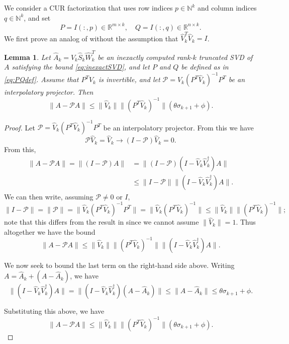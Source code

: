 \documentclass[10pt,a4paper]{amsart}
\newcommand{\What}{\widehat{W}}
\newcommand{\Shat}{\widehat{S}}
\newcommand{\Vhat}{\widehat{V}}
\newcommand{\E}{\theta}
\newcommand{\F}{\phi}
\def\norm#1{\|#1\|}
\newtheorem{lemma}[theorem]{Lemma}
\begin{document}
 We consider a CUR factorization that uses row indices $p\in\mathbb{N}^k$ and column indices $q\in\mathbb{N}^k$, and set
\begin{equation}
P=I(:,p)\in\mathbb{R}^{m\times k}, \quad Q=I(:,q)\in\mathbb{R}^{n\times k}.
\label{eq:PQdef}
\end{equation}
We first prove an analog of \cite[Lemma 4.1]{sorensen2016deim} without the assumption that $\Vhat_k^T \Vhat_k = I$. 

\begin{lemma}
Let $\widehat{A}_k = \Vhat_k \Shat_k \What_k^T$ be an inexactly computed rank-$k$ truncated SVD of $A$ satisfying the bound \eqref{eq:inexactSVD}, and let $P$ and $Q$ be defined as in \eqref{eq:PQdef}.
Assume that $P^T\Vhat_k$ is invertible, and let $\mathcal{P}=\Vhat_k(P^T\Vhat_k)^{-1}P^T$ be an interpolatory projector. Then 
%
\begin{equation*}
\norm{A-\mathcal{P}A} \leq \norm{\Vhat_k} \norm{(P^T\Vhat_k)^{-1}} (\E\sigma_{k+1}+\F).
\end{equation*}

\end{lemma}
\begin{proof}
    
 Let $\mathcal{P}=\Vhat_k(P^T\Vhat_k)^{-1}P^T$ be an interpolatory projector. From this we have
\[
\mathcal{P}\Vhat_k = \Vhat_k \rightarrow (I-\mathcal{P})\Vhat_k = 0.
\]
From this,
\begin{align*}
\norm{A-\mathcal{P}A} = \norm{(I-\mathcal{P})A} &= \norm{(I-\mathcal{P})(I-\Vhat_k \Vhat_k^\dagger)A} \\
&\leq \norm{I-\mathcal{P}} \norm{(I-\Vhat_k \Vhat_k^\dagger)A}.
\end{align*}
We can then write, assuming $\mathcal{P}\neq 0$ or $I$,
\[
\norm{I-\mathcal{P}} = \norm{\mathcal{P}} = \norm{\Vhat_k (P^T\Vhat_k)^{-1}P^T} = \norm{\Vhat_k (P^T\Vhat_k)^{-1}} \leq \norm{\Vhat_k}\norm{(P^T \Vhat_k)^{-1}};
\]
note that this differs from the result in \cite[Lemma 4.1]{sorensen2016deim} since we cannot assume $\norm{\Vhat_k}=1$.
Thus altogether we have the bound
\[
\norm{A-\mathcal{P}A} \leq \norm{\Vhat_k} \norm{(P^T\Vhat_k)^{-1}} \norm{(I-\Vhat_k\Vhat_k^\dagger)A}.
\]

We now seek to bound the last term on the right-hand side above. Writing $A = \widehat{A}_k + (A-\widehat{A}_k)$, we have
\begin{equation}
    \norm{(I-\Vhat_k\Vhat_k^\dagger)A} = \norm{(I-\Vhat_k \Vhat_k^\dagger)(A-\widehat{A}_k)} \leq \norm{A-\widehat{A}_k} \leq \E\sigma_{k+1} + \F.
\end{equation}



Substituting this above, we have 
\[
\norm{A-\mathcal{P}A} \leq \norm{\Vhat_k} \norm{(P^T\Vhat_k)^{-1}} (\E\sigma_{k+1}+\F).
\]

\end{proof}
\end{document}
